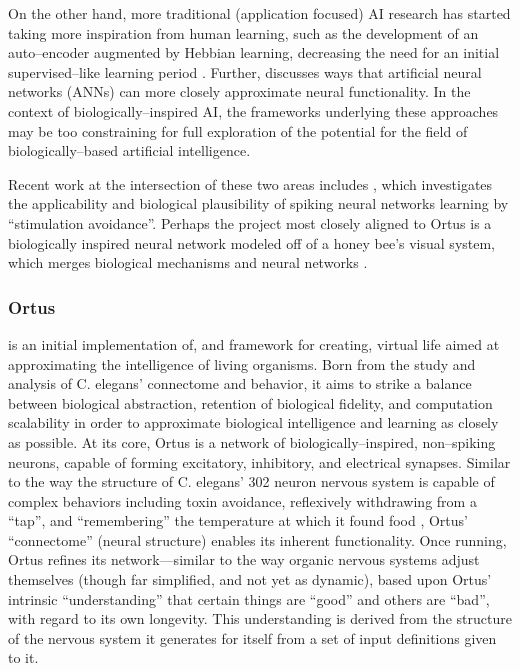 \documentclass[letterpaper]{article}
\begin{document}
On the other hand, more traditional (application focused) AI research has started taking more inspiration from human learning, such as the development of an auto--encoder augmented by Hebbian learning, decreasing the need for an initial supervised--like learning period \citep{Bowren2016}. Further, \citet{Marblestone2016} discusses ways that artificial neural networks (ANNs) can more closely approximate neural functionality.
In the context of biologically--inspired AI, the frameworks underlying these approaches may be too constraining for full exploration of the potential for the field of biologically--based artificial intelligence. 

Recent work at the intersection of these two areas includes \citet{Sinapayen2016}, which investigates the applicability and biological plausibility of spiking neural networks learning by ``stimulation avoidance''. Perhaps the project most closely aligned to Ortus is a biologically inspired neural network modeled off of a honey bee's visual system, which merges biological mechanisms and neural networks \citep{Roper2017}.


\subsubsection{Ortus} is an initial implementation of, and framework for creating, virtual life aimed at approximating the intelligence of living organisms.
Born from the study and analysis of C. elegans' connectome and behavior, it aims to strike a balance between biological abstraction, retention of biological fidelity, and computation scalability in order to approximate biological intelligence and learning as closely as possible.
At its core, Ortus is a network of biologically--inspired, non--spiking neurons, capable of forming excitatory, inhibitory, and electrical synapses.
Similar to the way the structure of C. elegans' 302 neuron nervous system is capable of complex behaviors including toxin avoidance, reflexively withdrawing from a ``tap'', and ``remembering'' the temperature at which it found food \citep{Jarrell2012}, Ortus' ``connectome'' (neural structure) enables its inherent functionality.
Once running, Ortus refines its network---similar to the way organic nervous systems adjust themselves (though far simplified, and not yet as dynamic), based upon Ortus' intrinsic ``understanding'' that certain things are ``good'' and others are ``bad'', with regard to its own longevity.
This understanding is derived from the structure of the nervous system it generates for itself from a set of input definitions given to it.
\end{document}
